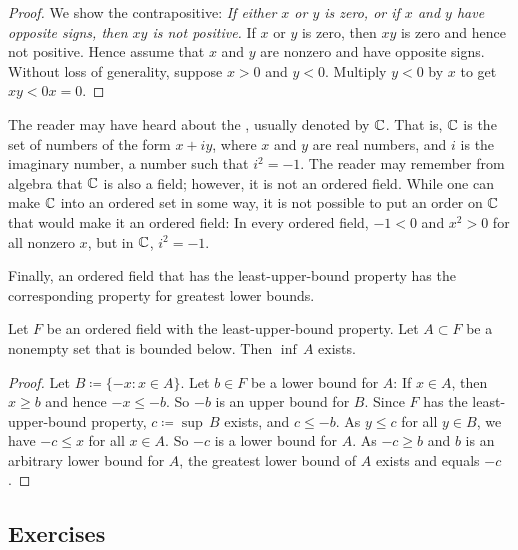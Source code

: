 \begin{proof}
We show the contrapositive: \emph{If either $x$ or $y$ is zero, or
if $x$ and $y$ have opposite signs, then $xy$ is not positive.}
If $x$ or $y$ is zero, then $xy$ is zero and hence not positive.
Hence assume that $x$ and $y$ are nonzero and have
opposite signs.
Without loss of generality,
suppose $x > 0$ and $y < 0$.
Multiply $y < 0$ by $x$ to get $xy < 0x = 0$.
\end{proof}

\begin{example} \label{example:complexfield}
The reader may have heard about the \emph{},
usually denoted by ${\mathbb{C}}$.
That is, ${\mathbb{C}}$ is the set of numbers of
the form $x + iy$, where $x$ and $y$ are real numbers, and $i$ is the
imaginary number, a number such that $i^2 = -1$.  The reader may
remember from algebra that ${\mathbb{C}}$ is also a field; however, it is not an
ordered field.  While one can make ${\mathbb{C}}$ into an ordered set in some way,
it is not possible to put an
order on ${\mathbb{C}}$ that would make it an ordered field: In every ordered field,
$-1 < 0$ and $x^2 > 0$ for all nonzero $x$, but in ${\mathbb{C}}$, $i^2 = -1$.
\end{example}

Finally, an ordered field that has the least-upper-bound property has the
corresponding property for greatest lower bounds.

\begin{prop}
Let $F$ be an ordered field with the least-upper-bound property.
Let $A \subset F$ be a nonempty set that is bounded below.
Then $\inf\, A$ exists.
\end{prop}

\begin{proof}
Let $B \coloneqq \{ -x : x \in A \}$. Let $b \in F$ be a lower bound for $A$:
If $x \in A$, then $x \geq b$
and hence $-x \leq -b$.  So $-b$
is an upper bound for $B$.
Since $F$ has the least-upper-bound property, $c\coloneqq\sup\, B$ exists, and $c \leq -b$.
As $y \leq c$
for all $y \in B$, we have $-c \leq x$ for all $x \in A$.
So
$-c$ is a lower bound for $A$.  As $-c \geq b$
and $b$ is an arbitrary lower bound for $A$,
the greatest lower bound of $A$ exists and equals $-c$.
\end{proof}

\subsection{Exercises}

